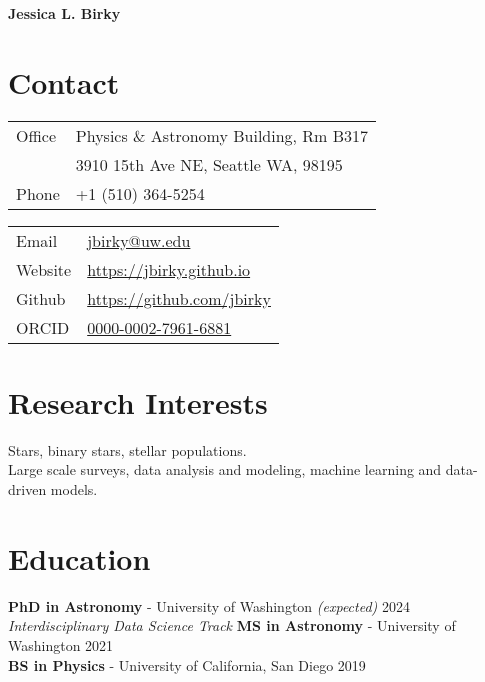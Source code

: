 \documentclass[margin,line]{resume}
\begin{document}
{\sc \textbf{\Large Jessica L. Birky}} 
\vspace{0.3cm}
\begin{resume}

 
\section{\mysidestyle \textcolor{bcolor}{Contact}}

\noindent\begin{multicols}{2}\small
\noindent\begin{tabular}{@{}l|l}
  \multirow{1}{*}{Office}   & Physics \& Astronomy Building, Rm B317  \\
  \multirow{1}{*}{}         & 3910 15th Ave NE, Seattle WA, 98195  \\
  \multirow{1}{*}{Phone}    & +1 (510) 364-5254 \\
\end{tabular}

\noindent\begin{tabular}{@{}l|l}
  \multirow{1}{*}{Email}    &   \href{jbirky@ucsd.edu}{jbirky@uw.edu} \\
  \multirow{1}{*}{Website}  &   \href{https://jbirky.github.io/}{https://jbirky.github.io} \\
  \multirow{1}{*}{Github}   &   \href{https://github.com/jbirky}{https://github.com/jbirky} \\
  \multirow{1}{*}{ORCID}    &   \href{https://orcid.org/0000-0002-7961-6881}{0000-0002-7961-6881} \\
\end{tabular} 
\end{multicols}


\section{\mysidestyle \textcolor{bcolor}{Research Interests}}
Stars, binary stars, stellar populations. \\
Large scale surveys, data analysis and modeling, machine learning and data-driven models. \\
 
       
\section{\mysidestyle \textcolor{bcolor}{Education}}
\textbf{PhD in Astronomy} - University of Washington \textit{(expected)} \hfill 2024 \\
\textsl{Interdisciplinary Data Science Track} \vspace{.1cm} \newline
\textbf{MS in Astronomy} - University of Washington  \hfill 2021 \\
\textbf{BS in Physics} - University of California, San Diego \hfill 2019 


\end{resume}
\end{document}
